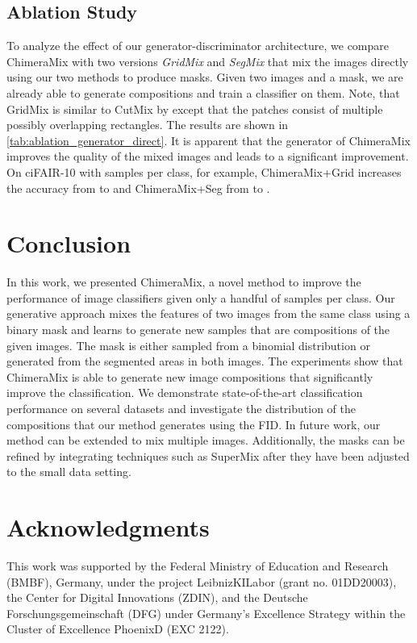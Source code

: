 \documentclass{article}
\newcommand{\methodname}{ChimeraMix\xspace}
\newcommand{\methodnamegrid}{ChimeraMix+Grid\xspace}
\newcommand{\methodnameseg}{ChimeraMix+Seg\xspace}
\newcommand{\textcite}[1]{\citeauthor{#1}\xspace\shortcite{#1}}
\newcommand{\cifairX}{ciFAIR-10\xspace}
\begin{document}
\subsection{Ablation Study}
\label{subsec:ablation_study}

To analyze the effect of our generator-discriminator architecture, we compare \methodname with two versions \emph{GridMix} and \emph{SegMix} that mix the images directly using our two methods to produce masks.
Given two images and a mask, we are already able to generate compositions and train a classifier on them.
Note, that GridMix is similar to CutMix by \textcite{yunCutMixRegularizationStrategy2019} except that the patches consist of multiple possibly overlapping rectangles.
The results are shown in \cref{tab:ablation_generator_direct}.
It is apparent that the generator of \methodname improves the quality of the mixed images and leads to a significant improvement. 
On \cifairX with  samples per class, for example, \methodnamegrid increases the accuracy from  to  and \methodnameseg from  to .

\section{Conclusion}
\label{sec:conclusion}

In this work, we presented \methodname, a novel method to improve the performance of image classifiers given only a handful of samples per class.
Our generative approach mixes the features of two images from the same class using a binary mask and learns to generate new samples that are compositions of the given images.
The mask is either sampled from a binomial distribution or generated from the segmented areas in both images.
The experiments show that \methodname is able to generate new image compositions that significantly improve the classification. 
We demonstrate state-of-the-art classification performance on several datasets and investigate the distribution of the compositions that our method generates using the \acl{FID}.
In future work, our method can be extended to mix multiple images.
Additionally, the masks can be refined by integrating techniques such as SuperMix after they have been adjusted to the small data setting.

\section*{Acknowledgments}
This work was supported by the Federal Ministry of Education and
Research (BMBF), Germany, under the project LeibnizKILabor (grant no.
01DD20003), the Center for Digital Innovations (ZDIN),
 and the Deutsche Forschungsgemeinschaft  (DFG)  under  Germany’s  Excellence  Strategy  within  the  Cluster of Excellence PhoenixD (EXC 2122).
 

{\small

}


\newpage

\end{document}
